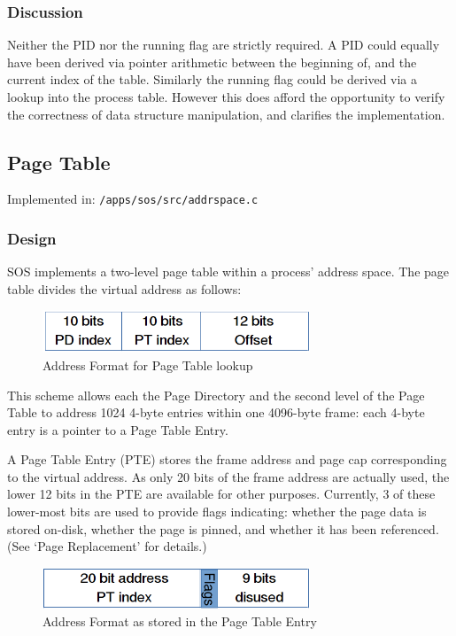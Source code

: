 \documentclass[a4paper,12pt]{article}
\begin{document}
\subsubsection{Discussion}
Neither the PID nor the running flag are strictly required.  A PID could
equally have been derived via pointer arithmetic between the beginning of,
and the current index of the table.  Similarly the running flag could be
derived via a lookup into the process table.  However this does afford the
opportunity to verify the correctness of data structure manipulation, and
clarifies the implementation.

\subsection{Page Table}
Implemented in: \texttt{/apps/sos/src/addrspace.c}

\subsubsection{Design}
SOS implements a two-level page table within a process' address space.  The
page table divides the virtual address as follows:

\begin{figure}[h!]
  \centering
  \includegraphics[width=80mm]{add-format.png}
  \caption{Address Format for Page Table lookup}
\end{figure}

This scheme allows each the Page Directory and the second level of the Page
Table to address 1024 4-byte entries within one 4096-byte frame: each 4-byte
entry is a pointer to a Page Table Entry.

A Page Table Entry (PTE) stores the frame address and page cap corresponding
to the virtual address.  As only 20 bits of the frame address are actually
used, the lower 12 bits in the PTE are available for other purposes.
Currently, 3 of these lower-most bits are used to provide flags indicating:
whether the page data is stored on-disk, whether the page is pinned, and
whether it has been referenced.  (See `Page Replacement' for details.)

\begin{figure}[h!]
  \centering
  \includegraphics[width=80mm]{pte-addr-format.png}
  \caption{Address Format as stored in the Page Table Entry}
\end{figure}
\end{document}
